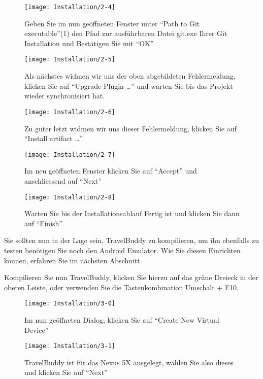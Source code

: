 \begin{figure}
  \centering
  \texttt{[image: Installation/2-4]}
  \caption{Geben Sie im nun geöffneten Fenster unter ``Path to Git executable''(1) den Pfad zur ausführbaren Datei git.exe Ihrer Git Installation und Bestätigen Sie mit ``OK''}
\end{figure}

\begin{figure}
  \centering
  \texttt{[image: Installation/2-5]}
  \caption{Als nächstes widmen wir uns der oben abgebildeten Fehlermeldung, klicken Sie auf ``Upgrade Plugin \ldots'' und warten Sie bis das Projekt wieder synchronisiert hat.}
\end{figure}

\begin{figure}
  \centering
  \texttt{[image: Installation/2-6]}
  \caption{Zu guter letzt widmen wir uns dieser Fehlermeldung, klicken Sie auf ``Install artifact \ldots''}
\end{figure}

\begin{figure}
  \centering
  \texttt{[image: Installation/2-7]}
  \caption{Im neu geöffneten Fenster klicken Sie auf ``Accept'' und anschliessend auf ``Next''}
\end{figure}

\begin{figure}
  \centering
  \texttt{[image: Installation/2-8]}
  \caption{Warten Sie bis der Installationsablauf Fertig ist und klicken Sie dann auf ``Finish''}
\end{figure}

Sie sollten nun in der Lage sein, TravelBuddy zu kompilieren, um ihn ebenfalls zu testen benötigen Sie noch den Android Emulator. Wie Sie diesen Einrichten können, erfahren Sie im nächsten Abschnitt.


Kompilieren Sie nun TravelBuddy, klicken Sie hierzu auf das grüne Dreieck in der oberen Leiste, oder verwenden Sie die Tastenkombination Umschalt + F10.

\begin{figure}
  \centering
  \texttt{[image: Installation/3-0]}
  \caption{Im nun geöffneten Dialog, klicken Sie auf ``Create New Virtual Device''}
\end{figure}

\begin{figure}
  \centering
  \texttt{[image: Installation/3-1]}
  \caption{TravelBuddy ist für das Nexus 5X ausgelegt, wählen Sie also dieses und klicken Sie auf ``Next''}
\end{figure}

